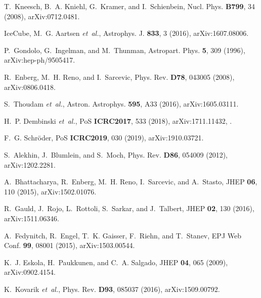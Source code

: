 \documentclass[12pt]{article}
\begin{document}
\begin{thebibliography}{99}
T.~Kneesch, B.~A. Kniehl, G.~Kramer, and I.~Schienbein,
\newblock Nucl. Phys. {\bf B799}, 34 (2008), arXiv:0712.0481.

IceCube, M.~G. Aartsen {\em et~al.},
\newblock Astrophys. J. {\bf 833}, 3 (2016), arXiv:1607.08006.

P.~Gondolo, G.~Ingelman, and M.~Thunman,
\newblock Astropart. Phys. {\bf 5}, 309 (1996), arXiv:hep-ph/9505417.

R.~Enberg, M.~H. Reno, and I.~Sarcevic,
\newblock Phys. Rev. {\bf D78}, 043005 (2008), arXiv:0806.0418.

S.~Thoudam {\em et~al.},
\newblock Astron. Astrophys. {\bf 595}, A33 (2016), arXiv:1605.03111.

H.~P. Dembinski {\em et~al.},
\newblock PoS {\bf ICRC2017}, 533 (2018), arXiv:1711.11432,
\newblock [35,533(2017)].

F.~G. Schr{\"o}der,
\newblock PoS {\bf ICRC2019}, 030 (2019), arXiv:1910.03721.

S.~Alekhin, J.~Blumlein, and S.~Moch,
\newblock Phys. Rev. {\bf D86}, 054009 (2012), arXiv:1202.2281.

A.~Bhattacharya, R.~Enberg, M.~H. Reno, I.~Sarcevic, and A.~Stasto,
\newblock JHEP {\bf 06}, 110 (2015), arXiv:1502.01076.

R.~Gauld, J.~Rojo, L.~Rottoli, S.~Sarkar, and J.~Talbert,
\newblock JHEP {\bf 02}, 130 (2016), arXiv:1511.06346.

A.~Fedynitch, R.~Engel, T.~K. Gaisser, F.~Riehn, and T.~Stanev,
\newblock EPJ Web Conf. {\bf 99}, 08001 (2015), arXiv:1503.00544.

K.~J. Eskola, H.~Paukkunen, and C.~A. Salgado,
\newblock JHEP {\bf 04}, 065 (2009), arXiv:0902.4154.

K.~Kovarik {\em et~al.},
\newblock Phys. Rev. {\bf D93}, 085037 (2016), arXiv:1509.00792.

\end{thebibliography}
\end{document}
